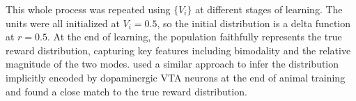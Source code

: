 \begin{figure*}[!t]
{        This whole process was repeated using $\{V_i\}$ at different stages of learning.
        The units were all initialized at $V_i = 0.5$, so the initial distribution is a delta function at $r = 0.5$.
        At the end of learning, the population faithfully represents the true reward distribution, capturing key features including bimodality and the relative magnitude of the two modes.
        \citet{dabney2020distributional} used a similar approach to infer the distribution implicitly encoded by dopaminergic VTA neurons at the end of animal training and found a close match to the true reward distribution.
        }
    \vspace*{-1.0em}
\end{figure*}

